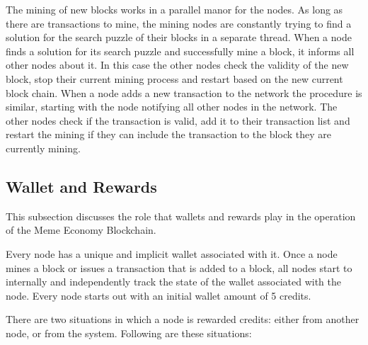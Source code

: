 \documentclass[12pt]{article}
\begin{document}
The mining of new blocks works in a parallel manor for the nodes. As long as there are transactions to mine, the mining nodes are constantly trying to find a solution for the search puzzle of their blocks in a separate thread. When a node finds a solution for its search puzzle and successfully mine a block, it informs all other nodes about it. In this case the other nodes check the validity of the new block, stop their current mining process and restart based on the new current block chain. When a node adds a new transaction to the network the procedure is similar, starting with the node notifying all other nodes in the network. The other nodes check if the transaction is valid, add it to their transaction list and restart the mining if they can include the transaction to the block they are currently mining.


\subsection{Wallet and Rewards} %

This subsection discusses the role that wallets and rewards play in the operation of the Meme Economy Blockchain.

Every node has a unique and implicit wallet associated with it. Once a node mines a block or issues a transaction that is added to a block, all nodes start to internally and independently track the state of the wallet associated with the node. Every node starts out with an initial wallet amount of 5 credits. %

There are two situations in which a node is rewarded credits: either from another node, or from the system. Following are these situations:
\end{document}
